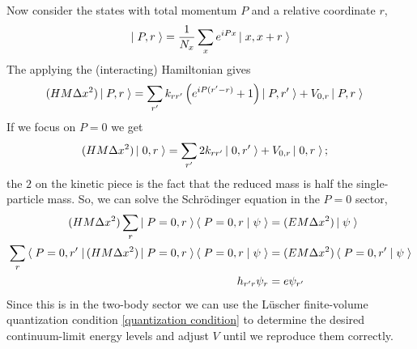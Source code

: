 Now consider the states with total momentum $P$ and a relative coordinate $r$,
\begin{align}
	\left|\;P,r\;\right\rangle = \frac{1}{N_x} \sum_x e^{iPx} \left|\;x,x+r\;\right\rangle
\end{align}
The applying the (interacting) Hamiltonian gives
\begin{align}
	(H M\Delta x^2) \left|\;P,r\;\right\rangle
	&=
			\sum_{r'} k_{rr'} \left( e^{iP(r'-r)}+1\right)\left|\;P,r'\;\right\rangle
		+	V_{0,r} \left|\;P,r\;\right\rangle
\end{align}
If we focus on $P=0$ we get
\begin{align}
	(H M\Delta x^2) \left|\;0,r\;\right\rangle
	&=
			\sum_{r'} 2k_{rr'} \left|\;0,r'\;\right\rangle
		+	V_{0,r} \left|\;0,r\;\right\rangle;
\end{align}
the $2$ on the kinetic piece is the fact that the reduced mass is half the single-particle mass.
So, we can solve the Schr\"{o}dinger equation in the $P=0$ sector,
\begin{align}
	(H M\Delta x^2) \sum_r \left|\;P=0,r\;\right\rangle\left\langle\;P=0,r\;\middle|\;\psi\;\right\rangle &= (EM\Delta x^2)\left|\;\psi\;\right\rangle
	\\
	\sum_r \left\langle\;P=0, r'\;\right| (H M \Delta x^2) \left|\;P=0,r\;\right\rangle\left\langle\;P=0,r\;\middle|\;\psi\;\right\rangle &= (E M\Delta x^2)\left\langle\;P=0,r'\;\middle|\;\psi\;\right\rangle
	\\
	h_{r'r} \psi_r &= e \psi_{r'}
\end{align}
Since this is in the two-body sector we can use the L\"{u}scher finite-volume quantization condition \eqref{quantization condition} to determine the desired continuum-limit energy levels and adjust $V$ until we reproduce them correctly.
